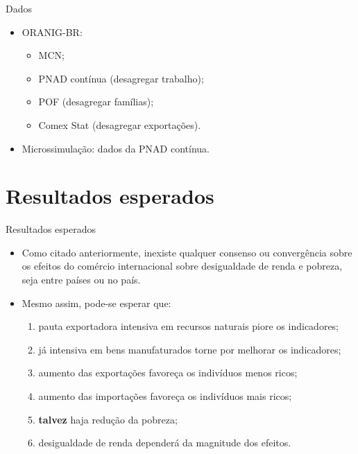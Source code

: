 \documentclass[10pt]{sintefbeamer}
\begin{document}
\begin{frame}{Dados}
	\begin{itemize}[<+->]
		
		\item ORANIG-BR:
		
		\begin{itemize}
			\item MCN;
			\item PNAD contínua (desagregar trabalho);
			\item POF (desagregar famílias);
			\item Comex Stat (desagregar exportações).
		\end{itemize}
		
		\item Microssimulação: dados da PNAD contínua.
	\end{itemize}
\end{frame}



\section{Resultados esperados}

\begin{frame}{Resultados esperados}
	\begin{itemize}[<+->]
		\item Como citado anteriormente, inexiste qualquer consenso ou convergência sobre os efeitos do comércio internacional sobre desigualdade de renda e pobreza, seja entre países ou no país.
		
		\item Mesmo assim, pode-se esperar que:
		
		\begin{enumerate}
			\item pauta exportadora intensiva em recursos naturais piore os indicadores;
			
			\item já intensiva em bens manufaturados torne por melhorar os indicadores;
			
			\item aumento das exportações favoreça os indivíduos menos ricos;
			
			\item aumento das importações favoreça os indivíduos mais ricos;
			
			\item \textbf{talvez} haja redução da pobreza;
			
			\item desigualdade de renda dependerá da magnitude dos efeitos.
		\end{enumerate}
	\end{itemize}
\end{frame}



\bibliographpage



\backmatter
\end{document}
